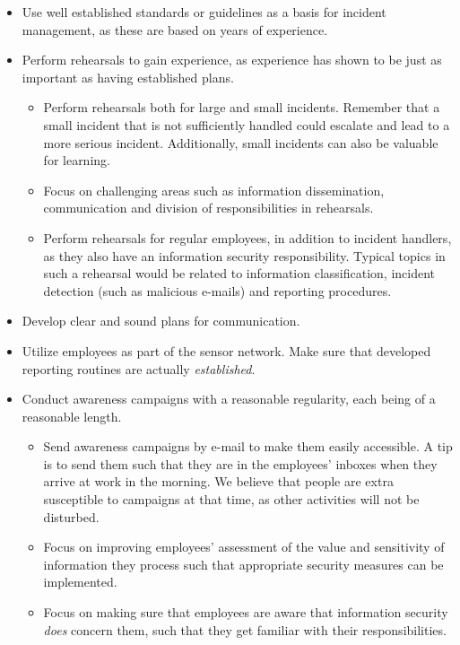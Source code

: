 \begin{itemize}
\item Use well established standards or guidelines as a basis for incident management, as these are based on years of experience. 
\item Perform rehearsals to gain experience, as experience has shown to be just as important as having established plans.
\begin{itemize}
\item Perform rehearsals both for large and small incidents. Remember that a small incident that is not sufficiently handled could escalate and lead to a more serious incident. Additionally, small incidents can also be valuable for learning.
\item Focus on challenging areas such as information dissemination, communication and division of responsibilities in rehearsals.
\item Perform rehearsals for regular employees, in addition to incident handlers, as they also have an information security responsibility. Typical topics in such a rehearsal would be related to information classification, incident detection (such as malicious e-mails) and reporting procedures. 
\end{itemize}
\item Develop clear and sound plans for communication.
\item Utilize employees as part of the sensor network. Make sure that developed reporting routines are actually \textit{established}.
\item Conduct awareness campaigns with a reasonable regularity, each being of a reasonable length. %
\begin{itemize}
\item Send awareness campaigns by e-mail to make them easily accessible. A tip is to send them such that they are in the employees' inboxes when they arrive at work in the morning. We believe that people are extra susceptible to campaigns at that time, as other activities will not be disturbed.
\item Focus on improving employees' assessment of the value and sensitivity of information they process such that appropriate security measures can be implemented. 
\item Focus on making sure that employees are aware that information security \textit{does} concern them, such that they get familiar with their responsibilities.

\end{itemize}
\end{itemize}
